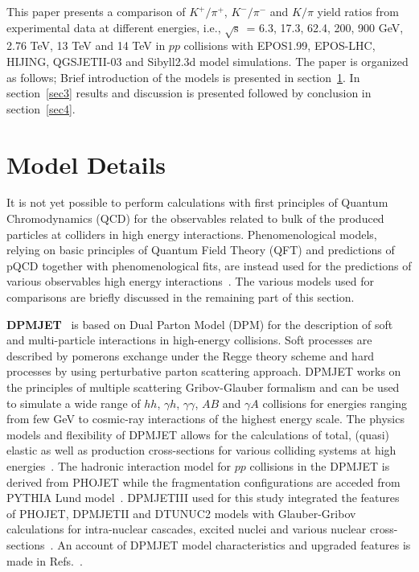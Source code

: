 \documentclass{article}
\newcommand{\sqrts}{\mbox{$\sqrt{\mathrm{s}}$}}
\begin{document}
This paper presents a comparison of $K^+/\pi^+$, $K^-/\pi^-$ and $K/\pi$ yield ratios from experimental data at different energies, i.e., \sqrts~= 6.3, 17.3, 62.4, 200, 900 GeV, 2.76 TeV, 13 TeV and 14 TeV in $pp$ collisions with EPOS1.99, EPOS-LHC, HIJING, QGSJETII-03 and Sibyll2.3d model simulations. The paper is organized as follows; Brief introduction of the models is presented in section~\ref{sec2}. In section~\ref{sec3} results and discussion is presented followed by conclusion in section~\ref{sec4}.   


\section{Model Details}\label{sec2}
 It is not yet possible to perform calculations with first principles of Quantum Chromodynamics (QCD) for the observables related to bulk of the produced particles at colliders in high energy interactions. Phenomenological models, relying on basic principles of Quantum Field Theory (QFT) and predictions of pQCD together with phenomenological fits, are instead used for the predictions of various observables high energy interactions~\cite{dEnterria:2011twh}. The various models used for comparisons are briefly discussed in the remaining part of this section.

{\bf DPMJET}~\cite{Roesler:2000he} is based on Dual Parton Model (DPM) for the description of soft and multi-particle interactions in high-energy collisions. Soft processes are described by pomerons exchange under the Regge theory scheme and hard processes by using perturbative parton scattering approach. DPMJET works on the principles of multiple scattering Gribov-Glauber formalism and can be used to simulate a wide range of $hh$, $\gamma h$, $\gamma \gamma$, $AB$ and $\gamma A$ collisions for energies ranging from few GeV to cosmic-ray interactions of the highest energy scale. The physics models and flexibility of DPMJET allows for the calculations of total, (quasi) elastic as well as production cross-sections for various colliding systems at high energies~\cite{Roesler:2000he}. The hadronic interaction model for $pp$ collisions in the DPMJET is derived from PHOJET while the fragmentation configurations are acceded from PYTHIA Lund model~\cite{ATLAS:2020bhl}. DPMJETIII used for this study integrated the features of PHOJET, DPMJETII and DTUNUC2 models with Glauber-Gribov calculations for intra-nuclear cascades, excited nuclei and various nuclear cross-sections~\cite{Roesler:2000he}. An account of DPMJET model characteristics and upgraded features is made in Refs.~\cite{Roesler:2000he, Bopp:2005cr}. 
\end{document}

